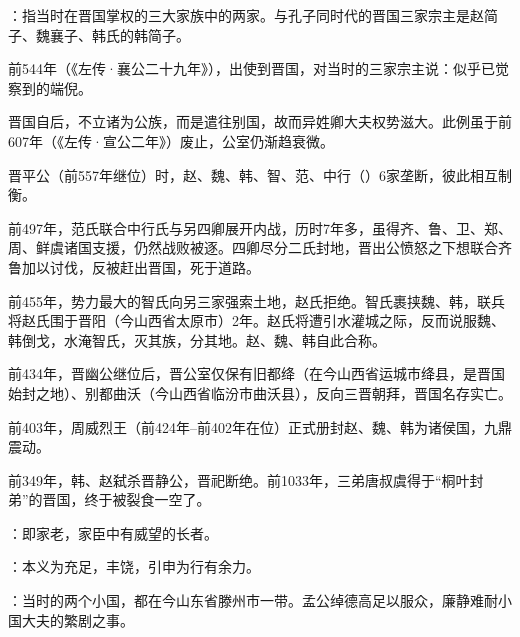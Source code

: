 {
\item {}：指当时在晋国掌权的三大家族中的两家。与孔子同时代的晋国三家宗主是赵简子、魏襄子、韩氏的韩简子。

前544年（《左传·襄公二十九年》），出使到晋国，对当时的三家宗主说：似乎已觉察到的端倪。
\begin{lyenumerate}
\item 晋国自后，不立诸为公族，而是遣往别国，故而异姓卿大夫权势滋大。此例虽于前607年（《左传·宣公二年》）废止，公室仍渐趋衰微。
\item {}晋平公（前557年继位）时，赵、魏、韩、智、范、中行（）6家垄断，彼此相互制衡。
\item {}前497年，范氏联合中行氏与另四卿展开内战，历时7年多，虽得齐、鲁、卫、郑、周、鲜虞诸国支援，仍然战败被逐。四卿尽分二氏封地，晋出公愤怒之下想联合齐鲁加以讨伐，反被赶出晋国，死于道路。
\item 前455年，势力最大的智氏向另三家强索土地，赵氏拒绝。智氏裹挟魏、韩，联兵将赵氏围于晋阳（今山西省太原市）2年。赵氏将遭引水灌城之际，反而说服魏、韩倒戈，水淹智氏，灭其族，分其地。赵、魏、韩自此合称。
\item 前434年，晋幽公继位后，晋公室仅保有旧都绛（在今山西省运城市绛县，是晋国始封之地）、别都曲沃（今山西省临汾市曲沃县），反向三晋朝拜，晋国名存实亡。
\item 前403年，周威烈王（前424年--前402年在位）正式册封赵、魏、韩为诸侯国，九鼎震动。
\item 前349年，韩、赵弑杀晋静公，晋祀断绝。前1033年，三弟唐叔虞得于“桐叶封弟”的晋国，终于被裂食一空了。
\end{lyenumerate}
\item {}：即家老，家臣中有威望的长者。

\item {}：本义为充足，丰饶，引申为行有余力。
\item {}：当时的两个小国，都在今山东省滕州市一带。孟公绰德高足以服众，廉静难耐小国大夫的繁剧之事。
}
{}


